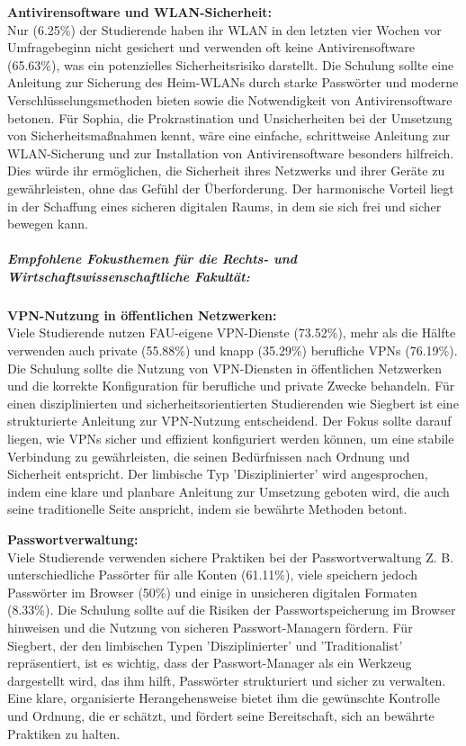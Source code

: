 \documentclass[german,report]{i1thesis}
\begin{document}
\textbf{Antivirensoftware und WLAN-Sicherheit:}\\
Nur (6.25\%) der Studierende haben ihr WLAN in den letzten vier Wochen vor Umfragebeginn nicht gesichert und verwenden oft keine Antivirensoftware (65.63\%), was ein potenzielles Sicherheitsrisiko darstellt. Die Schulung sollte eine Anleitung zur Sicherung des Heim-WLANs durch starke Passwörter und moderne Verschlüsselungsmethoden bieten sowie die Notwendigkeit von Antivirensoftware betonen. Für Sophia, die Prokrastination und Unsicherheiten bei der Umsetzung von Sicherheitsmaßnahmen kennt, wäre eine einfache, schrittweise Anleitung zur WLAN-Sicherung und zur Installation von Antivirensoftware besonders hilfreich. Dies würde ihr ermöglichen, die Sicherheit ihres Netzwerks und ihrer Geräte zu gewährleisten, ohne das Gefühl der Überforderung. Der harmonische Vorteil liegt in der Schaffung eines sicheren digitalen Raums, in dem sie sich frei und sicher bewegen kann.

\subparagraph{Empfohlene Fokusthemen für die Rechts- und Wirtschaftswissenschaftliche Fakultät:} 
\mbox{}

\textbf{VPN-Nutzung in öffentlichen Netzwerken:}\\
Viele Studierende nutzen FAU-eigene VPN-Dienste (73.52\%), mehr als die Hälfte verwenden auch private (55.88\%) und knapp (35.29\%) berufliche VPNs (76.19\%). Die Schulung sollte die Nutzung von VPN-Diensten in öffentlichen Netzwerken und die korrekte Konfiguration für berufliche und private Zwecke behandeln. Für einen disziplinierten und sicherheitsorientierten Studierenden wie Siegbert ist eine strukturierte Anleitung zur VPN-Nutzung entscheidend. Der Fokus sollte darauf liegen, wie VPNs sicher und effizient konfiguriert werden können, um eine stabile Verbindung zu gewährleisten, die seinen Bedürfnissen nach Ordnung und Sicherheit entspricht. Der limbische Typ 'Disziplinierter' wird angesprochen, indem eine klare und planbare Anleitung zur Umsetzung geboten wird, die auch seine traditionelle Seite anspricht, indem sie bewährte Methoden betont.

\textbf{Passwortverwaltung:}\\
Viele Studierende verwenden sichere Praktiken bei der Passwortverwaltung Z. B. unterschiedliche Passörter für alle Konten (61.11\%), viele speichern jedoch Passwörter im Browser (50\%) und einige in unsicheren digitalen Formaten (8.33\%). Die Schulung sollte auf die Risiken der Passwortspeicherung im Browser hinweisen und die Nutzung von sicheren Passwort-Managern fördern. Für Siegbert, der den limbischen Typen 'Disziplinierter' und 'Traditionalist' repräsentiert, ist es wichtig, dass der Passwort-Manager als ein Werkzeug dargestellt wird, das ihm hilft, Passwörter strukturiert und sicher zu verwalten. Eine klare, organisierte Herangehensweise bietet ihm die gewünschte Kontrolle und Ordnung, die er schätzt, und fördert seine Bereitschaft, sich an bewährte Praktiken zu halten.
\end{document}
